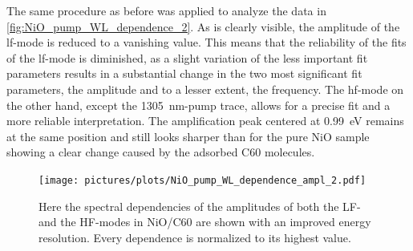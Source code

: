 The same procedure as before was applied to analyze the data in \autoref{fig:NiO_pump_WL_dependence_2}.
As is clearly visible, the amplitude of the lf-mode is reduced to a vanishing value.
This means that the reliability of the fits of the lf-mode is diminished, as a slight variation of the less important fit parameters results in a substantial change in the two most significant fit parameters, the amplitude and to a lesser extent, the frequency.
The hf-mode on the other hand, except the \qty{1305}{nm}-pump trace, allows for a precise fit and a more reliable interpretation.
The amplification peak centered at \qty{0.99}{eV} remains at the same position and still looks sharper than for the pure NiO sample showing a clear change caused by the adsorbed C60 molecules.
\begin{figure}[ht]
    \centering
    \texttt{[image: pictures/plots/NiO\_pump\_WL\_dependence\_ampl\_2.pdf]}
    \caption{Here the spectral dependencies of the amplitudes of both the LF- and the HF-modes in NiO/C60 are shown with an improved energy resolution. Every dependence is normalized to its highest value.}
    \label{fig:NiO_pump_WL_dependence_ampl_2}
\end{figure}
\FloatBarrier

